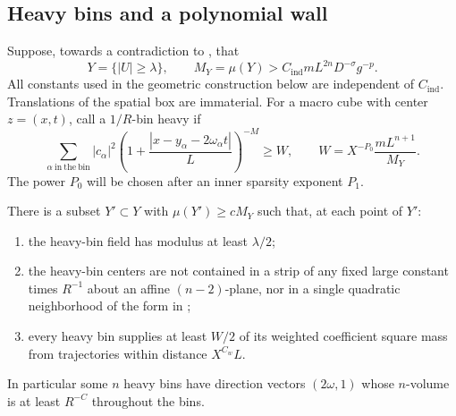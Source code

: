 \subsection{Heavy bins and a polynomial wall}\label{w:heavy}

Suppose, towards a contradiction to , that
\begin{equation}\label{w:eq-counterlevel}
 Y=\{|U|\geq\lambda\},\qquad
 M_Y=\mu(Y)>C_{\mathrm{ind}}mL^{2n}D^{-\sigma}g^{-p}.
\end{equation}
All constants used in the geometric construction below are independent
of $C_{\mathrm{ind}}$.  Translations of the spatial box are immaterial.
For a macro cube with center $z=(x,t)$, call a $1/R$-bin heavy if
\begin{equation}\label{w:eq-heavy}
 \sum_{\alpha\ \mathrm{in\ the\ bin}}|c_\alpha|^2
 \left(1+\frac{|x-y_\alpha-2\omega_\alpha t|}{L}\right)^{-M}
 \geq W,\qquad
 W=X^{-P_0}\frac{mL^{n+1}}{M_Y}.
\end{equation}
The power $P_0$ will be chosen after an inner sparsity exponent $P_1$.

\begin{lemma}\label{w:heavy-reduction}
There is a subset $Y'\subset Y$ with $\mu(Y')\geq cM_Y$ such that,
at each point of $Y'$:
\begin{enumerate}[label=\textup{(\roman*)}]
\item the heavy-bin field has modulus at least $\lambda/2$;
\item the heavy-bin centers are not contained in a strip of any fixed
large constant times $R^{-1}$ about an affine $(n-2)$-plane, nor in a
single quadratic neighborhood of the form in ;
\item every heavy bin supplies at least $W/2$ of its weighted
coefficient square mass from trajectories within distance $X^{C_w}L$.
\end{enumerate}
In particular some $n$ heavy bins have direction vectors
$(2\omega,1)$ whose $n$-volume is at least $R^{-C}$ throughout the
bins.
\end{lemma}

